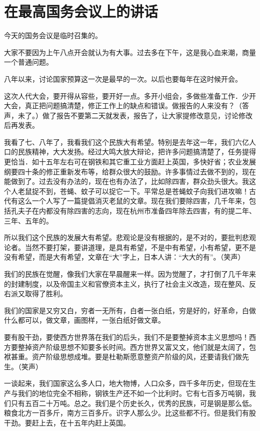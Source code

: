 \section[在最高国务会议上的讲话（一九五八年一月二十八日）]{在最高国务会议上的讲话}


今天的国务会议是临时召集的。

大家不要因为上午八点开会就认为有大事。过去多在下午，这是我心血来潮，商量一个普通问题。

八年以来，讨论国家预算这一次是最早的一次。以后也要每年在这时候开会。

这次人代大会，要开得从容些，要开好一点。多开小组会，多做些准备工作．少开大会，真正把问题搞清楚，修正工作上的缺点和错误。做报告的人来没有？（答声，未了。）做了报告不要第二天就发表，报告了，让大家提修改意见，讨论修改后再发表。

我看了七、八年了，我看我们这个民族大有希望。特别是去年这一年，我们六亿人口的民族精神，大大发扬。经过大鸣大放大辩论，把许多问题搞清楚了，任务提得更恰当．如十五年左右可在钢铁和其它重工业方面赶上英国，多快好省；农业发展纲要四十条的修正重新发布等，给群众很大的鼓励。许多事情过去做不到的，现在能做到了。过去没有办法的，现在也有办法了，比如除四害，群众劲头很大。我这个人老鼠捉不到，苍蝇、蚊子可以捉它一下。平常总是苍蝇蚊子向我们进攻嘛！古代有这么一个人写了一篇提倡消灭老鼠的文章。现在我们要除四害，几千年来，包括孔夫子在内都没有除四害的志向，现在杭州市准备四年除去四害，有的提二年、三年、五年的。

所以我们这个民族的发展大有希望。悲观论是没有根据的，是不对的，要批判悲观论者。当然不要打架，要讲道理，是具有希望，不是中有希望，小有希望，更不是没有希望，而是大有希望，文章在“大”字上，日本人讲：“大大的有”。（笑声）

我们的民族在觉醒，像我们大家在早晨醒来一样。因为觉醒了，才打倒了几千年来的封建制度，以及帝国主义和官僚资本主义，执行了社会主义改造，现在整风、反右派又取得了胜利。

我们的国家是又穷又白，穷者一无所有，白者一张白纸，穷是好的，好革命，白做什么都可以，做文章，画图样，一张白纸好做文章。

要有股干劲，要使西方世界落在我们的后头，我们不是要整掉资本主义思想吗！西方要整掉资产阶级思想不知要多长时间。西方世界又富又文，他们就是太阔了，包袱甚重。资产阶级思想成堆。要是杜勒斯愿意整资产阶级的风，还要请我们做先生。（笑声）

一谈起来，我们国家这么多人口，地大物博，人口众多，四千多年历史，但现在生产与我们的地位完全不相称，钢铁生产还不如一个比利时。它有七百多万吨钢，我们只有五百二十万吨。总之。我们是个历史长久，优秀的民族，可是钢是那么低。粮食北方一百多斤，南方三百多斤。识字人那么少。比这些都不行。但是我们有股干劲。要赶上去，在十五年内赶上英国。


